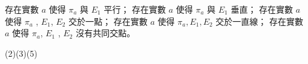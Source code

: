 \begin{QUESTIONS}
\begin{QUESTION}
\begin{QBODY}
            \begin{QOPS} 
                \QOP 存在實數 $a$ 使得 $\pi_a$ 與 $E_1$ 平行；
                \QOP 存在實數 $a$ 使得 $\pi_a$ 與 $E_1$ 垂直；
                \QOP 存在實數 $a$ 使得 $\pi_a$ , $E_1$, $E_2$ 交於一點； 
                \QOP 存在實數 $a$ 使得 $\pi_a, E_1, E_2 $ 交於一直線；
                \QOP 存在實數 $a$ 使得 $\pi_a$, $E_1$ , $E_2$ 沒有共同交點。\end{QOPS}
            \end{QBODY}
        \begin{QFROMS}
        \end{QFROMS}
        \begin{QTAGS}\end{QTAGS}
        \begin{QANS}
            (2)(3)(5)
        \end{QANS}
        \begin{QSOLLIST}
        \end{QSOLLIST}
        \begin{QEMPTYSPACE}
        \end{QEMPTYSPACE}
    \end{QUESTION}
\end{QUESTIONS}
